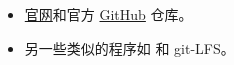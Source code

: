 
\begin{issues}
\issueDraft
\end{issues}

\begin{itemize}
\item \href{https://bup.github.io/}{官网}和官方 \href{https://github.com/bup/bup}{GitHub} 仓库。
\item 另一些类似的程序如  和 git-LFS。
\end{itemize}

